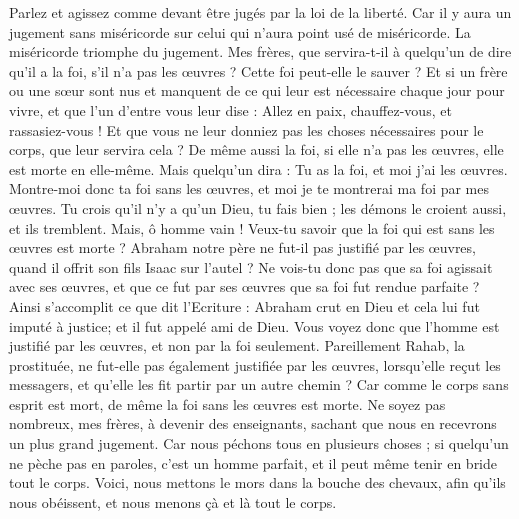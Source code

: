 \begin{multicols}{2}
Parlez et agissez comme devant être jugés par la loi de la liberté.
Car il y aura un jugement sans miséricorde sur celui qui n'aura point usé de miséricorde. La miséricorde triomphe du jugement.
Mes frères, que servira-t-il à quelqu'un de dire qu'il a la foi, s'il n'a pas les œuvres ? Cette foi peut-elle le sauver ?
Et si un frère ou une sœur sont nus et manquent de ce qui leur est nécessaire chaque jour pour vivre,
et que l'un d'entre vous leur dise : Allez en paix, chauffez-vous, et rassasiez-vous ! Et que vous ne leur donniez pas les choses nécessaires pour le corps, que leur servira cela ?
De même aussi la foi, si elle n'a pas les œuvres, elle est morte en elle-même.
Mais quelqu'un dira : Tu as la foi, et moi j'ai les œuvres. Montre-moi donc ta foi sans les œuvres, et moi je te montrerai ma foi par mes œuvres.
Tu crois qu'il n'y a qu'un Dieu, tu fais bien ; les démons le croient aussi, et ils tremblent.
Mais, ô homme vain ! Veux-tu savoir que la foi qui est sans les œuvres est morte ?
Abraham notre père ne fut-il pas justifié par les œuvres, quand il offrit son fils Isaac sur l'autel ?
Ne vois-tu donc pas que sa foi agissait avec ses œuvres, et que ce fut par ses œuvres que sa foi fut rendue parfaite ?
Ainsi s'accomplit ce que dit l'Ecriture : Abraham crut en Dieu et cela lui fut imputé à justice; et il fut appelé ami de Dieu.
Vous voyez donc que l'homme est justifié par les œuvres, et non par la foi seulement.
Pareillement Rahab, la prostituée, ne fut-elle pas également justifiée par les œuvres, lorsqu'elle reçut les messagers, et qu'elle les fit partir par un autre chemin ?
Car comme le corps sans esprit est mort, de même la foi sans les œuvres est morte.
\VerseOne{}Ne soyez pas nombreux, mes frères, à devenir des enseignants, sachant que nous en recevrons un plus grand jugement.
Car nous péchons tous en plusieurs choses ; si quelqu'un ne pèche pas en paroles, c'est un homme parfait, et il peut même tenir en bride tout le corps.
Voici, nous mettons le mors dans la bouche des chevaux, afin qu'ils nous obéissent, et nous menons çà et là tout le corps.

\end{multicols}
